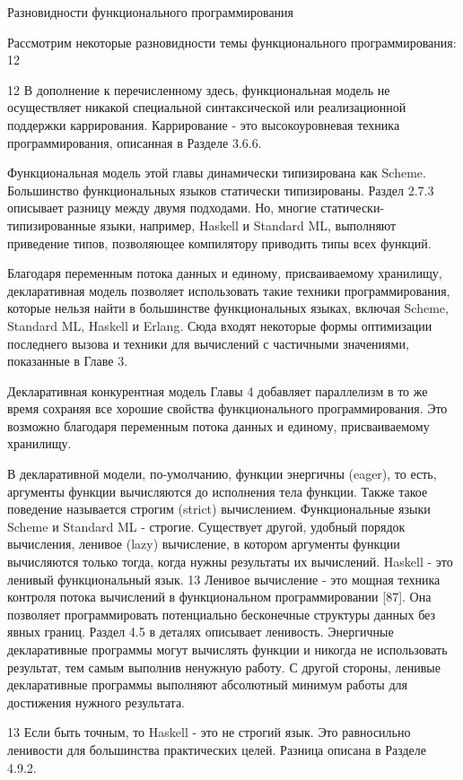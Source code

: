 Разновидности функционального программирования

Рассмотрим некоторые разновидности темы функционального программирования: 12

12 В дополнение к перечисленному здесь, функциональная модель не осуществляет никакой специальной синтаксической или реализационной поддержки каррирования. Каррирование - это высокоуровневая техника программирования, описанная в Разделе 3.6.6.

Функциональная модель этой главы динамически типизирована как Scheme. Большинство функциональных языков статически типизированы. Раздел 2.7.3 описывает разницу между двумя подходами. Но, многие статически-типизированные языки, например, Haskell и Standard ML, выполняют приведение типов, позволяющее компилятору приводить типы всех функций.

Благодаря переменным потока данных и единому, присваиваемому хранилищу, декларативная модель позволяет использовать такие техники программирования, которые нельзя найти в большинстве функциональных языках, включая Scheme, Standard ML, Haskell и Erlang. Сюда входят некоторые формы оптимизации последнего вызова и техники для вычислений с частичными значениями, показанные в Главе 3.

Декларативная конкурентная модель Главы 4 добавляет параллелизм в то же время сохраняя все хорошие свойства функционального программирования. Это возможно благодаря переменным потока данных и единому, присваиваемому хранилищу.

В декларативной модели, по-умолчанию, функции энергичны (eager), то есть, аргументы функции вычисляются до исполнения тела функции. Также такое поведение называется строгим (strict) вычислением. Функциональные языки Scheme и Standard ML - строгие. Существует другой, удобный порядок вычисления, ленивое (lazy) вычисление, в котором аргументы функции вычисляются только тогда, когда нужны результаты их вычислений. Haskell - это ленивый функциональный язык. 13 Ленивое вычисление - это мощная техника контроля потока вычислений в функциональном программировании [87]. Она позволяет программировать потенциально бесконечные структуры данных без явных границ. Раздел 4.5 в деталях описывает ленивость. Энергичные декларативные программы могут вычислять функции и никогда не использовать результат, тем самым выполнив ненужную работу. С другой стороны, ленивые декларативные программы выполняют абсолютный минимум работы для достижения нужного результата.

13 Если быть точным, то Haskell - это не строгий язык. Это равносильно ленивости для большинства практических целей. Разница описана в Разделе 4.9.2.

